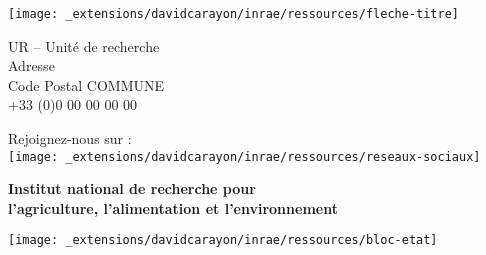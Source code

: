 
\thispagestyle{empty}


\begin{center}

\color{inrae}

\vspace*{10cm}

\texttt{[image: \_extensions/davidcarayon/inrae/ressources/fleche-titre]}\par

\sffamily
UR -- Unité de recherche\\
Adresse\\
Code Postal COMMUNE\\
+33 (0)0 00 00 00 00\par\bigskip

Rejoignez-nous sur :\\
\texttt{[image: \_extensions/davidcarayon/inrae/ressources/reseaux-sociaux]}\par\bigskip

\vspace*{2cm}

{\bfseries Institut national de recherche pour\\
l'agriculture, l'alimentation et l'environnement}\par\bigskip

\texttt{[image: \_extensions/davidcarayon/inrae/ressources/bloc-etat]}\par

\end{center}

\restoregeometry
